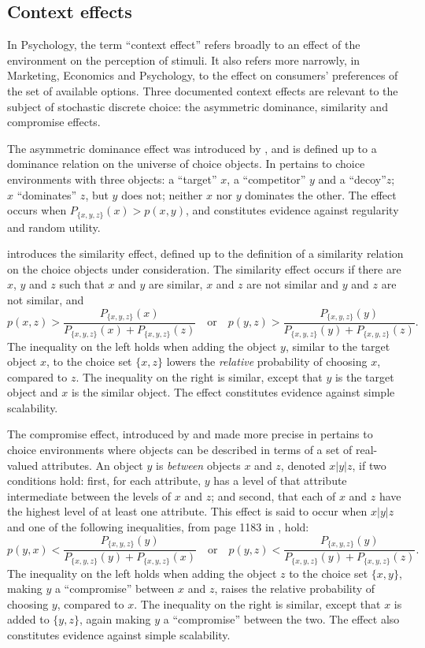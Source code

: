 \documentclass[11pt,letter]{article}
\begin{document}
\subsection{Context effects}

In Psychology, the term ``context effect'' refers broadly to an effect of the environment on the perception of stimuli.
It also refers more narrowly, in Marketing, Economics and Psychology, to the effect on consumers' preferences of the set of available options.
Three documented context effects are relevant to the subject of stochastic discrete choice: the asymmetric dominance, similarity and compromise effects.

The asymmetric dominance effect was introduced by , and is defined up to a dominance relation on the universe of choice objects.
In pertains to choice environments with three objects: a ``target'' $x$, a ``competitor'' $y$ and a ``decoy''$z$; $x$ ``dominates'' $z$, but $y$ does not; neither $x$ nor $y$ dominates the other.
The effect occurs when $P_{\{x,y,z\}}(x) > p(x,y)$, and constitutes evidence against regularity and random utility.

 introduces the similarity effect, defined up to the definition of a similarity relation on the choice objects under consideration.
The similarity effect occurs if there are $x$, $y$ and $z$ such that $x$ and $y$ are similar, $x$ and $z$ are not similar and $y$ and $z$ are not similar, and
\[
	p(x,z) > \frac{P_{\{x,y,z\}}(x)}{P_{\{x,y,z\}}(x) + P_{\{x,y,z\}}(z)}
	\quad \mbox{or} \quad
	p(y,z) > \frac{P_{\{x,y,z\}}(y)}{P_{\{x,y,z\}}(y) + P_{\{x,y,z\}}(z)}.
\]
The inequality on the left holds when adding the object $y$, similar to the target object $x$, to the choice set $\{x,z\}$ lowers the {\em relative} probability of choosing $x$, compared to $z$.
The inequality on the right is similar, except that $y$ is the target object and $x$ is the similar object.
The effect constitutes evidence against simple scalability.

The compromise effect, introduced by  and made more precise in  pertains to choice environments where objects can be described in terms of a set of real-valued attributes.
An object $y$ is {\em between} objects $x$ and $z$, denoted $x|y|z$, if two conditions hold: first, for each attribute, $y$ has a level of that attribute intermediate between the levels of $x$ and $z$; and second, that each of $x$ and $z$ have the highest level of at least one attribute.
This effect is said to occur when $x|y|z$ and one of the following inequalities, from page 1183 in , hold:
\[
	p(y,x) < \frac{P_{\{x,y,z\}}(y)}{P_{\{x,y,z\}}(y) + P_{\{x,y,z\}}(x)}
	\quad \mbox{or} \quad
	p(y,z) < \frac{P_{\{x,y,z\}}(y)}{P_{\{x,y,z\}}(y) + P_{\{x,y,z\}}(z)}.
\]
The inequality on the left holds when adding the object $z$ to the choice set $\{x,y\}$, making $y$ a ``compromise'' between $x$ and $z$, raises the relative probability of choosing $y$, compared to $x$.
The inequality on the right is similar, except that $x$ is added to $\{y,z\}$, again making $y$ a ``compromise'' between the two.
The effect also constitutes evidence against simple scalability.
\end{document}
